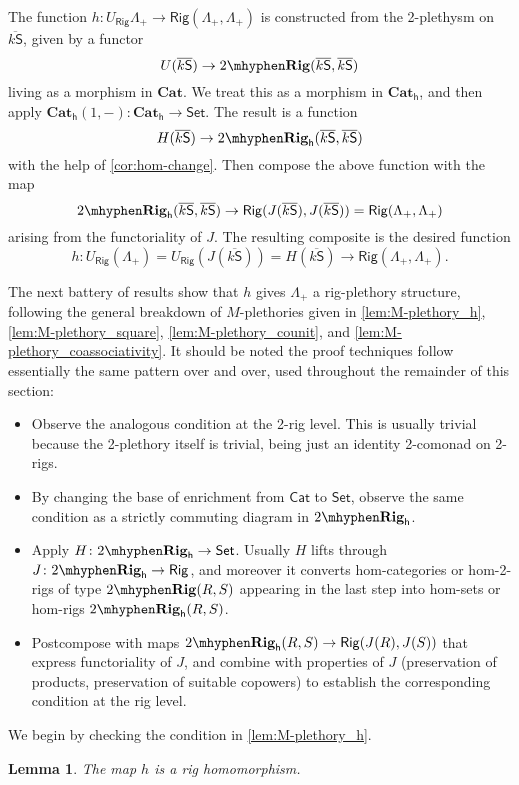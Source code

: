 \documentclass[12pt,reqno]{amsart}
\theoremstyle{plain}
\newtheorem{lem}[thm]{Lemma}
\theoremstyle{definition}
\theoremstyle{remark}
\newcommand{\maps}{\colon}
\newcommand{\category}[1]{\mathsf{#1}}
\renewcommand{\S}{\category S}
\newcommand{\namedcat}[1]{\mathsf{#1}}
\newcommand{\Cat}{\namedcat{Cat}}
\newcommand{\Rig}{\namedcat{Rig}}
\newcommand{\Set}{\namedcat{Set}}
\newcommand{\TRig}{2\mhyphen\namedbicat{Rig}}
\newcommand{\namedbicat}[1]{\mathbf{#1}}
\newcommand{\CCat}{\namedbicat{Cat}}
\newcommand{\ho}{_\mathsf{h}}
\newcommand{\ksbar}{\overline{k\S}}
\numberwithin{thm}{section}
\begin{document}
The function $h \maps U_\Rig\Lambda_+ \to \Rig(\Lambda_+, \Lambda_+)$ is constructed from the 2-plethysm on $\ksbar$, given by a functor
\[
U(\ksbar) \to \TRig(\ksbar, \ksbar)
\]
living as a morphism in $\CCat$. We treat this as a morphism in $\CCat\ho$, and then apply $\CCat\ho(1, -) \maps \CCat\ho \to \Set$. The result is a function 
\[
H(\ksbar) \to \TRig\ho(\ksbar, \ksbar)
\]
with the help of \cref{cor:hom-change}. Then compose the above function with the map 
\[
\TRig\ho(\ksbar, \ksbar) \to \Rig(J(\ksbar), J(\ksbar)) = \Rig(\Lambda_+, \Lambda_+)
\]
arising from the functoriality of $J$. The resulting composite is the desired function 
\[
h \maps U_\Rig(\Lambda_+) = U_\Rig(J(\ksbar)) = H(\ksbar) \to \Rig(\Lambda_+, \Lambda_+).
\]

The next battery of results show that $h$ gives $\Lambda_+$ a rig-plethory structure, following the general breakdown of $M$-plethories given in \cref{lem:M-plethory_h}, \cref{lem:M-plethory_square}, \cref{lem:M-plethory_counit}, and \cref{lem:M-plethory_coassociativity}. It should be noted the proof techniques follow essentially the same pattern over and over, used throughout the remainder of this section: 

\begin{itemize}
    \item Observe the analogous condition at the 2-rig level. This is usually trivial because the 2-plethory itself is trivial, being just an identity 2-comonad on 2-rigs. 
    \item By changing the base of enrichment from $\Cat$ to $\Set$, observe the same condition as a strictly commuting diagram in $\TRig\ho$. 
    \item Apply $H \maps \TRig\ho \to \Set$. Usually $H$ lifts through $J \maps \TRig\ho \to \Rig$, and moreover it converts hom-categories or hom-2-rigs of type $\TRig(R, S)$ appearing in the last step into hom-sets or hom-rigs $\TRig\ho(R, S)$. 
    \item Postcompose with maps $\TRig\ho(R, S) \to \Rig(J(R), J(S))$ that express functoriality of $J$, and combine with properties of $J$ (preservation of products, preservation of suitable copowers) to establish the corresponding condition at the rig level. 
\end{itemize}

We begin by checking the condition in \cref{lem:M-plethory_h}.

\begin{lem}
\label{lem:h-is-rig-map}
   The map $h$ is a rig homomorphism. 
\end{lem}
\end{document}
